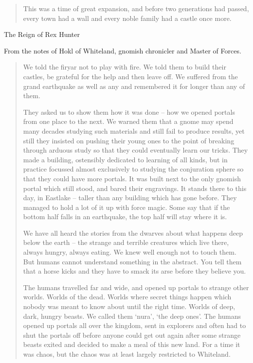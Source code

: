 \begin{multicols}{2}
\begin{quotation}
	This was a time of great expansion, and before two generations had passed, every town had a wall and every noble family had a castle once more.
\end{quotation}


The Reign of Rex Hunter\label{r_hunter}

From the notes of Hokl of Whiteland, gnomish chronicler and Master of Forces.

\begin{quotation}
	
We told the firyar not to play with fire.  We told them to build their castles, be grateful for the help and then leave off.  We suffered from the grand earthquake as well as any and remembered it for longer than any of them.  

	They asked us to show them how it was done -- how we opened portals from one place to the next.  We warned them that a gnome may spend many decades studying such materials and still fail to produce results, yet still they insisted on pushing their young ones to the point of breaking through arduous study so that they could eventually learn our tricks.  They made a building, ostensibly dedicated to learning of all kinds, but in practice focussed almost exclusively to studying the conjuration sphere so that they could have more portals.  It was built next to the only gnomish portal which still stood, and bared their engravings.  It stands there to this day, in Eastlake -- taller than any building which has gone before.  They managed to hold a lot of it up with force magic.  Some say that if the bottom half falls in an earthquake, the top half will stay where it is.

	We have all heard the stories from the dwarves about what happens deep below the earth -- the strange and terrible creatures which live there, always hungry, always eating.  We knew well enough not to touch them.  But humans cannot understand something in the abstract.  You tell them that a horse kicks and they have to smack its arse before they believe you.

	The humans travelled far and wide, and opened up portals to strange other worlds.  Worlds of the dead.  Worlds where secret things happen which nobody was meant to know about until the right time.  Worlds of deep, dark, hungry beasts.  We called them `nura', `the deep ones'.  The humans opened up portals all over the kingdom, sent in explorers and often had to shut the portals off before anyone could get out again after some strange beasts exited and decided to make a meal of this new land.  For a time it was chaos, but the chaos was at least largely restricted to Whiteland.


\end{quotation}
\end{multicols}
